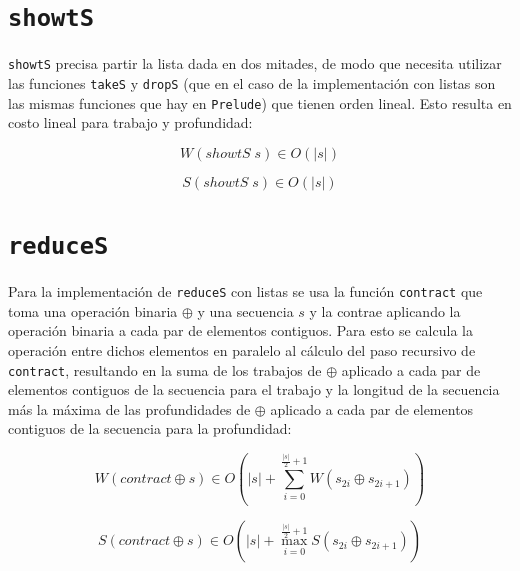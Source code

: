 \documentclass[a4paper,10pt]{article}
\begin{document}
\section*{\texttt{showtS}}

\texttt{showtS} precisa partir la lista dada en dos mitades, de modo que necesita
utilizar las funciones \texttt{takeS} y \texttt{dropS} (que en el caso de la
implementación con listas son las mismas funciones que hay en \texttt{Prelude})
que tienen orden lineal. Esto resulta en costo lineal para trabajo y profundidad:

\begin{equation*}
    W \left( showtS \; s \right) \in
    O \left( \vert s \vert \right)
\end{equation*}

\begin{equation*}
    S \left( showtS \; s \right) \in
    O \left( \vert s \vert \right)
\end{equation*}


\section*{\texttt{reduceS}}

Para la implementación de \texttt{reduceS} con listas se usa la función \texttt{contract}
que toma una operación binaria $\oplus$ y una secuencia $s$ y la contrae aplicando
la operación binaria a cada par de elementos contiguos. Para esto se calcula la
operación entre dichos elementos en paralelo al cálculo del paso recursivo de
\texttt{contract}, resultando en la suma de los trabajos de $\oplus$ aplicado a
cada par de elementos contiguos de la secuencia para el trabajo y la longitud de
la secuencia más la máxima de las profundidades de $\oplus$ aplicado a cada par de
elementos contiguos de la secuencia para la profundidad:

\begin{equation*}
    W \left( contract \oplus s \right) \in
    O \left( \vert s \vert + \sum_{i=0}^{\frac{\vert s \vert}{2} + 1} W \left( s_{2i} \oplus s_{2i+1} \right) \right)
\end{equation*}

\begin{equation*}
    S \left( contract \oplus s \right) \in
    O \left( \vert s \vert + \max_{i=0}^{\frac{\vert s \vert}{2} + 1} S \left( s_{2i} \oplus s_{2i+1} \right) \right)
\end{equation*}
\end{document}
